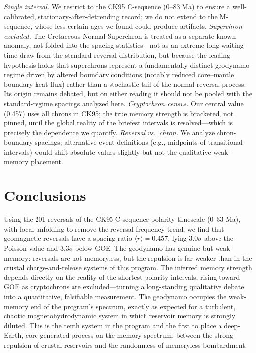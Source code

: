 \documentclass[12pt,a4paper]{article}
\begin{document}
\emph{Single interval.} We restrict to the CK95 C-sequence (0--83 Ma) to ensure a well-calibrated, stationary-after-detrending record; we do not extend to the M-sequence, whose less certain ages we found could produce artifacts. \emph{Superchron excluded.} The Cretaceous Normal Superchron is treated as a separate known anomaly, not folded into the spacing statistics---not as an extreme long-waiting-time draw from the standard reversal distribution, but because the leading hypothesis holds that superchrons represent a fundamentally distinct geodynamo regime driven by altered boundary conditions (notably reduced core--mantle boundary heat flux) rather than a stochastic tail of the normal reversal process. Its origin remains debated, but on either reading it should not be pooled with the standard-regime spacings analyzed here. \emph{Cryptochron census.} Our central value (0.457) uses all chrons in CK95; the true memory strength is bracketed, not pinned, until the global reality of the briefest intervals is resolved---which is precisely the dependence we quantify. \emph{Reversal vs.\ chron.} We analyze chron-boundary spacings; alternative event definitions (e.g., midpoints of transitional intervals) would shift absolute values slightly but not the qualitative weak-memory placement.

\section{Conclusions}

Using the 201 reversals of the CK95 C-sequence polarity timescale (0--83 Ma), with local unfolding to remove the reversal-frequency trend, we find that geomagnetic reversals have a spacing ratio $\langle r\rangle=0.457$, lying $3.0\sigma$ above the Poisson value and $3.3\sigma$ below GOE. The geodynamo has genuine but weak memory: reversals are not memoryless, but the repulsion is far weaker than in the crustal charge-and-release systems of this program. The inferred memory strength depends directly on the reality of the shortest polarity intervals, rising toward GOE as cryptochrons are excluded---turning a long-standing qualitative debate into a quantitative, falsifiable measurement. The geodynamo occupies the weak-memory end of the program's spectrum, exactly as expected for a turbulent, chaotic magnetohydrodynamic system in which reservoir memory is strongly diluted. This is the tenth system in the program and the first to place a deep-Earth, core-generated process on the memory spectrum, between the strong repulsion of crustal reservoirs and the randomness of memoryless bombardment.
\end{document}
